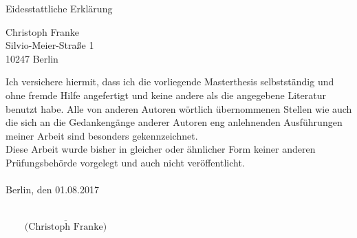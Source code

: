 \begin{titlepage}	


	{\vspace{-60mm}	
		\Huge Eidesstattliche Erklärung} 
	\vspace{60mm}	
	
	\vspace*{-10mm}	
	
	
Christoph Franke \\
Silvio-Meier-Straße 1 \\
10247 Berlin \\
\vspace{10mm}

Ich versichere hiermit, dass ich die vorliegende Masterthesis selbstständig und ohne fremde Hilfe angefertigt und keine andere als die angegebene Literatur benutzt habe. Alle von anderen Autoren wörtlich übernommenen Stellen wie auch die sich an die Gedankengänge anderer Autoren eng anlehnenden Ausführungen meiner Arbeit sind besonders gekennzeichnet.\\ 

Diese Arbeit wurde bisher in gleicher oder ähnlicher Form keiner anderen Prüfungsbehörde vorgelegt und auch nicht veröffentlicht.\\\\


\noindent Berlin, den 01.08.2017 \\\\
\begin{flushright}
	$\overline{~~~~~~~~~\mbox{(Christoph Franke)}~~~~~~~~~}$
\end{flushright}

\end{titlepage}